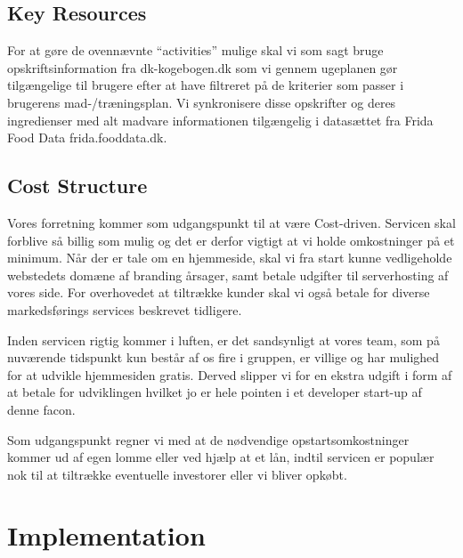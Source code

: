 \documentclass{article}
\begin{document}
\newpage
\subsection{Key Resources}
For at gøre de ovennævnte “activities” mulige skal vi som sagt bruge opskriftsinformation fra dk-kogebogen.dk som vi gennem ugeplanen gør tilgængelige til brugere efter at have filtreret på de kriterier som passer i brugerens mad-/træningsplan. Vi synkronisere disse opskrifter og deres ingredienser med alt madvare informationen tilgængelig i datasættet fra Frida Food Data frida.fooddata.dk.

\subsection{Cost Structure}
Vores forretning kommer som udgangspunkt til at være Cost-driven. Servicen skal forblive så billig som mulig og det er derfor vigtigt at vi holde omkostninger på et minimum. Når der er tale om en hjemmeside, skal vi fra start kunne vedligeholde webstedets domæne af branding årsager, samt betale udgifter til serverhosting af vores side. For overhovedet at tiltrække kunder skal vi også betale for diverse markedsførings services beskrevet tidligere. 

Inden servicen rigtig kommer i luften, er det sandsynligt at vores team, som på nuværende tidspunkt kun består af os fire i gruppen, er villige og har mulighed for at udvikle hjemmesiden gratis. Derved slipper vi for en ekstra udgift i form af at betale for udviklingen hvilket jo er hele pointen i et developer start-up af denne facon. 

Som udgangspunkt regner vi med at de nødvendige opstartsomkostninger kommer ud af egen lomme eller ved hjælp at et lån, indtil servicen er populær nok til at tiltrække eventuelle investorer eller vi bliver opkøbt. 


\newpage
\section{Implementation}
\end{document}
